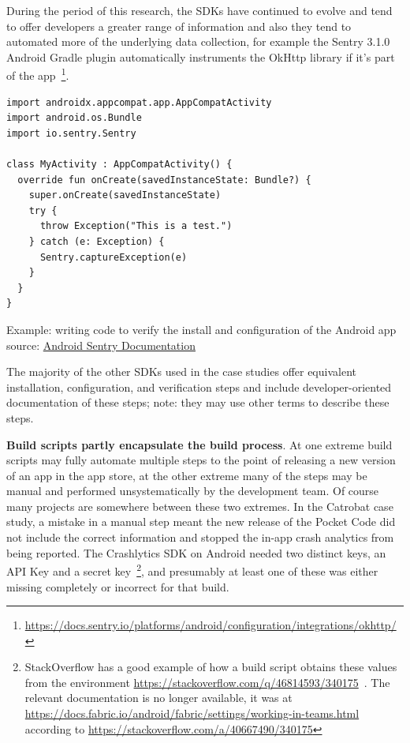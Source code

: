During the period of this research, the SDKs have continued to evolve and tend to offer developers a greater range of information and also they tend to automated more of the underlying data collection, for example the Sentry 3.1.0 Android Gradle plugin automatically instruments the OkHttp library if it's part of the app~\footnote{\url{https://docs.sentry.io/platforms/android/configuration/integrations/okhttp/}}.


\begin{listing}
\begin{verbatim}
import androidx.appcompat.app.AppCompatActivity
import android.os.Bundle
import io.sentry.Sentry

class MyActivity : AppCompatActivity() {
  override fun onCreate(savedInstanceState: Bundle?) {
    super.onCreate(savedInstanceState)
    try {
      throw Exception("This is a test.")
    } catch (e: Exception) {
      Sentry.captureException(e)
    }
  }
}
\end{verbatim}
\caption{Example: writing code to verify the install and configuration of the Android app\\ source: \href{https://docs.sentry.io/platforms/android/}{Android Sentry Documentation}}
\label{listing:android_activity_to_verify_sentry_works_in_app}
\end{listing}

The majority of the other SDKs used in the case studies offer equivalent installation, configuration, and verification steps and include developer-oriented documentation of these steps; note: they may use other terms to describe these steps.

\textbf{Build scripts partly encapsulate the build process}.  
At one extreme build scripts may fully automate multiple steps to the point of releasing a new version of an app in the app store, at the other extreme many of the steps may be manual and performed unsystematically by the development team. Of course many projects are somewhere between these two extremes. In the Catrobat case study, a mistake in a manual step meant the new release of the Pocket Code did not include the correct information and stopped the in-app crash analytics from being reported. The Crashlytics SDK on Android needed two distinct keys, an API Key and a secret key~\footnote{StackOverflow has a good example of how a build script obtains these values from the environment \url{https://stackoverflow.com/q/46814593/340175}~\citep{scott2017_android_app_crash_noclassdeffounderror_on_samsung_lollipop_devices}. The relevant documentation is no longer available, it was at \url{https://docs.fabric.io/android/fabric/settings/working-in-teams.html} according to \url{https://stackoverflow.com/a/40667490/340175}}, and presumably at least one of these was either missing completely or incorrect for that build.

